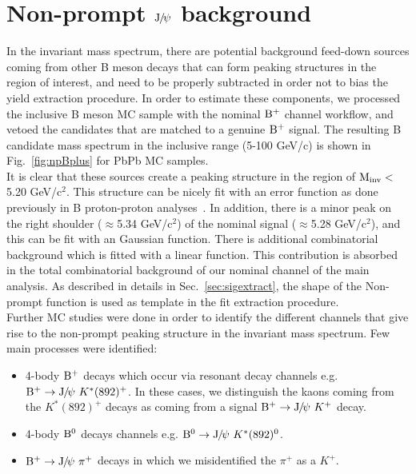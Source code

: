 \section{Non-prompt $\mathrm{J}\hspace{-.08em}/\hspace{-.14em}\psi$ background}
\label{sec:nonprompt}
In the \Bplus invariant mass spectrum, there are potential background feed-down sources coming from other B meson decays that can form peaking structures in the region of interest, and need to be properly subtracted in order not to bias the yield extraction procedure. In order to estimate these components, we processed the inclusive B meson MC sample with the nominal $\mathrm{B}^{+}$ channel workflow, and vetoed the candidates that are matched to a genuine $\mathrm{B}^{+}$ signal. The resulting B candidate mass spectrum in the inclusive \pt range (5-100 GeV/c) is shown in Fig.~\ref{fig:npBplus} for PbPb MC samples. \\
It is clear that these sources create a peaking structure in the region of $\rm M_{inv}<$5.20 GeV/c$^2$. This structure can be nicely fit with an error function as done previously in B proton-proton analyses~\cite{CMS-PAS-BPH-15-004}. In addition, there is a minor peak on the right shoulder ($\approx$5.34 GeV/c$^2$) of the nominal signal ($\approx$5.28 GeV/c$^2$), and this can be fit with an Gaussian function. There is additional combinatorial background which is fitted with a linear function. This contribution is absorbed in the total combinatorial background of our nominal channel of the main analysis. As described in details in Sec.~\ref{sec:sigextract}, the shape of the Non-prompt function is used as template in the fit extraction procedure. \\
Further MC studies were done in order to identify the different channels that give rise to the non-prompt peaking structure in the \Bplus invariant mass spectrum. Few main processes were identified:

\begin{itemize}
\item 4-body $\mathrm{B}^{+}$ decays which occur via resonant decay channels e.g. $\mathrm{B}^{+}\rightarrow\mathrm{J}\hspace{-.08em}/\hspace{-.14em}\psi~K^{*}(892)^{+}$.
      In these cases, we distinguish the kaons coming from the $K^{*}(892)^{+}$ decays as coming from a signal $\mathrm{B}^{+}\rightarrow\mathrm{J}\hspace{-.08em}/\hspace{-.14em}\psi~K^+$ decay. 
\item 4-body $\mathrm{B}^{0}$ decays channels e.g. $\mathrm{B}^{0}\rightarrow\mathrm{J}\hspace{-.08em}/\hspace{-.14em}\psi~K^{*}(892)^{0}$.
\item $\mathrm{B}^{+}\rightarrow\mathrm{J}\hspace{-.08em}/\hspace{-.14em}\psi~\pi^+$ decays in which we misidentified the $\pi^+$ as a $K^+$.
\end{itemize}

